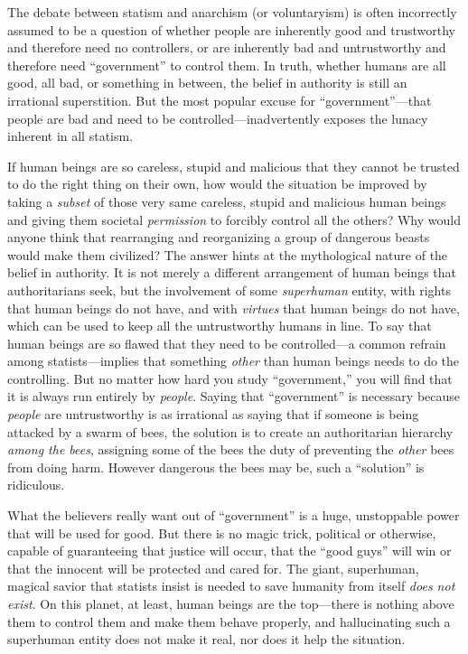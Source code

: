 \documentclass{book}
\begin{document}
The debate between statism and anarchism (or voluntaryism) is often incorrectly assumed to be a question of whether people are inherently good and trustworthy and therefore need no controllers, or are inherently bad and untrustworthy and therefore need \enquote{government} to control them. In truth, whether humans are all good, all bad, or something in between, the belief in authority is still an irrational superstition. But the most popular excuse for \enquote{government}---that people are bad and need to be controlled---inadvertently exposes the lunacy inherent in all statism.

If human beings are so careless, stupid and malicious that they cannot be trusted to do the right thing on their own, how would the situation be improved by taking a \emph{subset} of those very same careless, stupid and malicious human beings and giving them societal \emph{permission} to forcibly control all the others? Why would anyone think that rearranging and reorganizing a group of dangerous beasts would make them civilized? The answer hints at the mythological nature of the belief in authority. It is not merely a different arrangement of human beings that authoritarians seek, but the involvement of some \emph{superhuman} entity, with rights that human beings do not have, and with \emph{virtues} that human beings do not have, which can be used to keep all the untrustworthy humans in line. To say that human beings are so flawed that they need to be controlled---a common refrain among statists---implies that something \emph{other} than human beings needs to do the controlling. But no matter how hard you study \enquote{government,} you will find that it is always run entirely by \emph{people}. Saying that \enquote{government} is necessary because \emph{people} are untrustworthy is as irrational as saying that if someone is being attacked by a swarm of bees, the solution is to create an authoritarian hierarchy \emph{among the bees}, assigning some of the bees the duty of preventing the \emph{other} bees from doing harm. However dangerous the bees may be, such a \enquote{solution} is ridiculous.

What the believers really want out of \enquote{government} is a huge, unstoppable power that will be used for good. But there is no magic trick, political or otherwise, capable of guaranteeing that justice will occur, that the \enquote{good guys} will win or that the innocent will be protected and cared for. The giant, superhuman, magical savior that statists insist is needed to save humanity from itself \emph{does not exist}. On this planet, at least, human beings are the top---there is nothing above them to control them and make them behave properly, and hallucinating such a superhuman entity does not make it real, nor does it help the situation.
\end{document}
